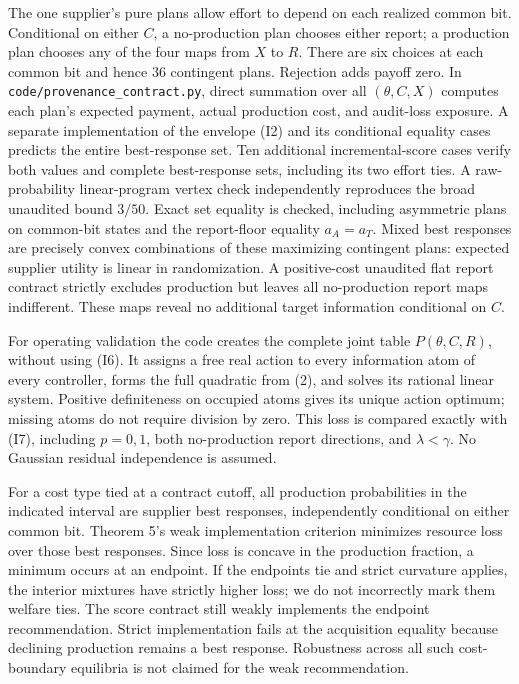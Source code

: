 \documentclass[
  11pt,
]{article}
\begin{document}
The one supplier's pure plans allow effort to depend on each realized
common bit. Conditional on either \(C\), a no-production plan chooses
either report; a production plan chooses any of the four maps from \(X\)
to \(R\). There are six choices at each common bit and hence 36
contingent plans. Rejection adds payoff zero. In
\texttt{code/provenance\_contract.py}, direct summation over all
\((\theta,C,X)\) computes each plan's expected payment, actual
production cost, and audit-loss exposure. A separate implementation of
the envelope (I2) and its conditional equality cases predicts the entire
best-response set. Ten additional incremental-score cases verify both
values and complete best-response sets, including its two effort ties. A
raw-probability linear-program vertex check independently reproduces the
broad unaudited bound \(3/50\). Exact set equality is checked, including
asymmetric plans on common-bit states and the report-floor equality
\(a_A=a_T\). Mixed best responses are precisely convex combinations of
these maximizing contingent plans: expected supplier utility is linear
in randomization. A positive-cost unaudited flat report contract
strictly excludes production but leaves all no-production report maps
indifferent. These maps reveal no additional target information
conditional on \(C\).

For operating validation the code creates the complete joint table
\(P(\theta,C,R)\), without using (I6). It assigns a free real action to
every information atom of every controller, forms the full quadratic
from (2), and solves its rational linear system. Positive definiteness
on occupied atoms gives its unique action optimum; missing atoms do not
require division by zero. This loss is compared exactly with (I7),
including \(p=0,1\), both no-production report directions, and
\(\lambda<\gamma\). No Gaussian residual independence is assumed.

For a cost type tied at a contract cutoff, all production probabilities
in the indicated interval are supplier best responses, independently
conditional on either common bit. Theorem 5's weak implementation
criterion minimizes resource loss over those best responses. Since loss
is concave in the production fraction, a minimum occurs at an endpoint.
If the endpoints tie and strict curvature applies, the interior mixtures
have strictly higher loss; we do not incorrectly mark them welfare ties.
The score contract still weakly implements the endpoint recommendation.
Strict implementation fails at the acquisition equality because
declining production remains a best response. Robustness across all such
cost-boundary equilibria is not claimed for the weak recommendation.
\end{document}
